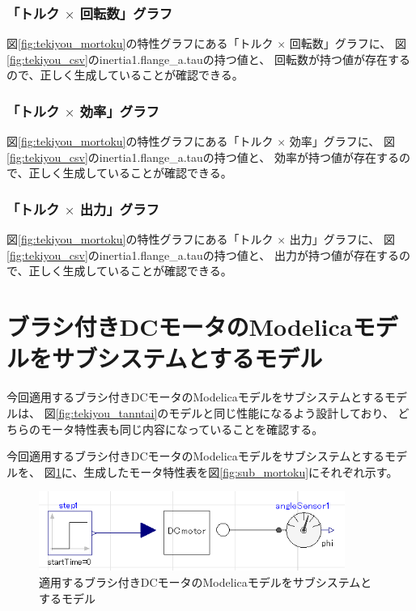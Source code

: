 \subsubsection{「トルク $\times$ 回転数」グラフ}
図\ref{fig:tekiyou_mortoku}の特性グラフにある「トルク $\times$ 回転数」グラフに、
図\ref{fig:tekiyou_csv}のinertia1.flange\_a.tauの持つ値と、
回転数が持つ値が存在するので、正しく生成していることが確認できる。

\subsubsection{「トルク $\times$ 効率」グラフ}
図\ref{fig:tekiyou_mortoku}の特性グラフにある「トルク $\times$ 効率」グラフに、
図\ref{fig:tekiyou_csv}のinertia1.flange\_a.tauの持つ値と、
効率が持つ値が存在するので、正しく生成していることが確認できる。

\subsubsection{「トルク $\times$ 出力」グラフ}
図\ref{fig:tekiyou_mortoku}の特性グラフにある「トルク $\times$ 出力」グラフに、
図\ref{fig:tekiyou_csv}のinertia1.flange\_a.tauの持つ値と、
出力が持つ値が存在するので、正しく生成していることが確認できる。


\section{ブラシ付きDCモータのModelicaモデルをサブシステムとするモデル}
今回適用するブラシ付きDCモータのModelicaモデルをサブシステムとするモデルは、
図\ref{fig:tekiyou_tanntai}のモデルと同じ性能になるよう設計しており、
どちらのモータ特性表も同じ内容になっていることを確認する。

今回適用するブラシ付きDCモータのModelicaモデルをサブシステムとするモデルを、
図\ref{fig:tekiyou_sub}に、生成したモータ特性表を図\ref{fig:sub_mortoku}にそれぞれ示す。

\begin{figure}[t]
	\centering
	\includegraphics[width=10cm]{./Image/tekiyou_sub.png}
	\caption{適用するブラシ付きDCモータのModelicaモデルをサブシステムとするモデル}
	\label{fig:tekiyou_sub}
\end{figure}

